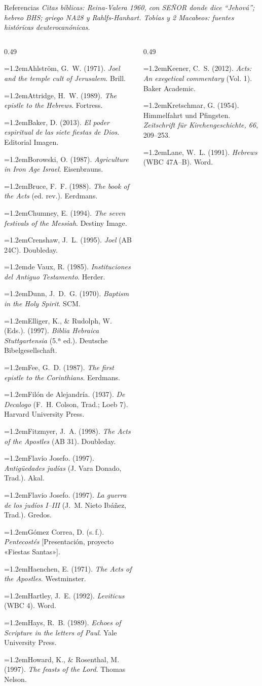 \documentclass[hyperref={bookmarks=false},aspectratio=169]{beamer}
\newcommand{\SENOR}{S{\fontsize{0.78em}{1em}\selectfont EÑOR}}
\newcommand{\refapa}[1]{\par{\RaggedRight\hangindent=1.2em\hangafter=1\noindent #1\par}\vspace{3pt}}
\begin{document}
\begin{frame}{Referencias}
\fontsize{4.8}{5.6}\selectfont
\textit{Citas bíblicas: Reina-Valera 1960, con \SENOR{} donde dice ``Jehová''; hebreo BHS; griego NA28 y Rahlfs-Hanhart. Tobías y 2 Macabeos: fuentes históricas deuterocanónicas.}\par\smallskip
\begin{columns}[t,onlytextwidth]
\begin{column}{0.49\textwidth}
\refapa{Ahlström, G.~W. (1971). \emph{Joel and the temple cult of Jerusalem}. Brill.}
\refapa{Attridge, H.~W. (1989). \emph{The epistle to the Hebrews}. Fortress.}
\refapa{Baker, D. (2013). \emph{El poder espiritual de las siete fiestas de Dios}. Editorial Imagen.}
\refapa{Borowski, O. (1987). \emph{Agriculture in Iron Age Israel}. Eisenbrauns.}
\refapa{Bruce, F.~F. (1988). \emph{The book of the Acts} (ed. rev.). Eerdmans.}
\refapa{Chumney, E. (1994). \emph{The seven festivals of the Messiah}. Destiny Image.}
\refapa{Crenshaw, J.~L. (1995). \emph{Joel} (AB 24C). Doubleday.}
\refapa{de Vaux, R. (1985). \emph{Instituciones del Antiguo Testamento}. Herder.}
\refapa{Dunn, J.~D.~G. (1970). \emph{Baptism in the Holy Spirit}. SCM.}
\refapa{Elliger, K., \& Rudolph, W. (Eds.). (1997). \emph{Biblia Hebraica Stuttgartensia} (5.ª ed.). Deutsche Bibelgesellschaft.}
\refapa{Fee, G.~D. (1987). \emph{The first epistle to the Corinthians}. Eerdmans.}
\refapa{Filón de Alejandría. (1937). \emph{De Decalogo} (F.~H. Colson, Trad.; Loeb 7). Harvard University Press.}
\refapa{Fitzmyer, J.~A. (1998). \emph{The Acts of the Apostles} (AB 31). Doubleday.}
\refapa{Flavio Josefo. (1997). \emph{Antigüedades judías} (J. Vara Donado, Trad.). Akal.}
\refapa{Flavio Josefo. (1997). \emph{La guerra de los judíos I--III} (J.~M. Nieto Ibáñez, Trad.). Gredos.}
\refapa{Gómez Correa, D. (s.\,f.). \emph{Pentecostés} [Presentación, proyecto «Fiestas Santas»].}
\refapa{Haenchen, E. (1971). \emph{The Acts of the Apostles}. Westminster.}
\refapa{Hartley, J.~E. (1992). \emph{Leviticus} (WBC 4). Word.}
\refapa{Hays, R.~B. (1989). \emph{Echoes of Scripture in the letters of Paul}. Yale University Press.}
\refapa{Howard, K., \& Rosenthal, M. (1997). \emph{The feasts of the Lord}. Thomas Nelson.}
\end{column}
\begin{column}{0.49\textwidth}
\refapa{Keener, C.~S. (2012). \emph{Acts: An exegetical commentary} (Vol. 1). Baker Academic.}
\refapa{Kretschmar, G. (1954). Himmelfahrt und Pfingsten. \emph{Zeitschrift für Kirchengeschichte, 66}, 209--253.}
\refapa{Lane, W.~L. (1991). \emph{Hebrews} (WBC 47A--B). Word.}

\end{column}
\end{columns}
\end{frame}
\end{document}
